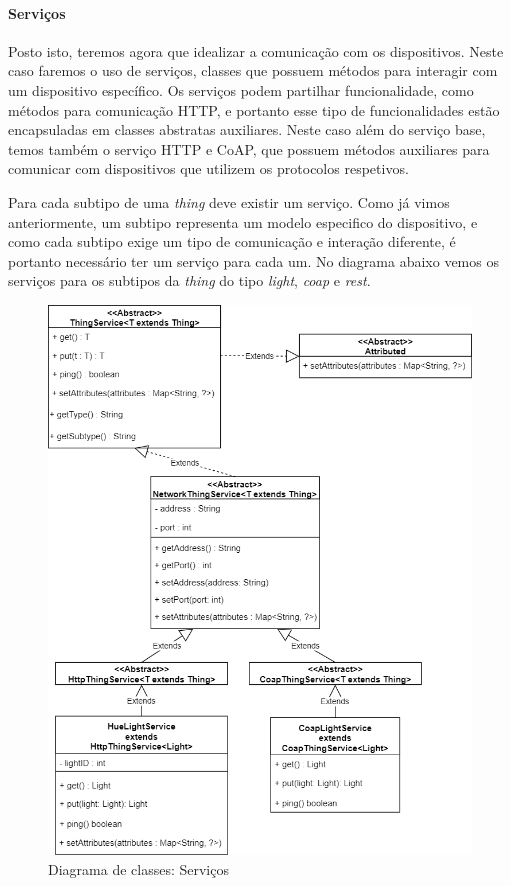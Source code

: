 %
%
%
%

\paragraph*{Serviços}

Posto isto, teremos agora que idealizar a comunicação com os dispositivos. Neste caso faremos o uso de serviços, classes que possuem métodos para interagir com um dispositivo específico. Os serviços podem partilhar funcionalidade, como métodos para comunicação HTTP, e portanto esse tipo de funcionalidades estão encapsuladas em classes abstratas auxiliares. Neste caso além do serviço base, temos também o serviço HTTP e CoAP, que possuem métodos auxiliares para comunicar com dispositivos que utilizem os protocolos respetivos.

Para cada subtipo de uma \textit{thing} deve existir um serviço. Como já vimos anteriormente, um subtipo representa um modelo especifico do dispositivo, e como cada subtipo exige um tipo de comunicação e interação diferente, é portanto necessário ter um serviço para cada um. No diagrama abaixo vemos os serviços para os subtipos da \textit{thing} do tipo \textit{light}, \textit{coap} e \textit{rest}.

\begin{figure}[H]
  \centering
        \includegraphics[scale=0.5]{img/hub-services.png}
  \caption{Diagrama de classes: Serviços}
\end{figure}

